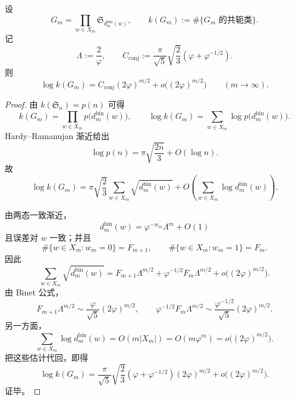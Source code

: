 \begin{theorem}[规范群共轭类数的显式主项]\label{thm:conclusion-binfold-gauge-conjugacy-midscale-asymptotic}
设
\[
G_m=\prod_{w\in X_m}\mathfrak S_{d_m^{\mathrm{bin}}(w)},
\qquad
k(G_m):=\#\{\text{\(G_m\) 的共轭类}\}.
\]
记
\[
\Lambda:=\frac{2}{\varphi},
\qquad
C_{\mathrm{conj}}
:=
\frac{\pi}{\sqrt5}\sqrt{\frac23}\left(\varphi+\varphi^{-1/2}\right).
\]
则
\[
\log k(G_m)
=
C_{\mathrm{conj}}(2\varphi)^{m/2}
+o\!\bigl((2\varphi)^{m/2}\bigr)
\qquad(m\to\infty).
\]
\end{theorem}
\begin{proof}
由 \(k(\mathfrak S_n)=p(n)\) 可得
\[
k(G_m)=\prod_{w\in X_m}p\!\bigl(d_m^{\mathrm{bin}}(w)\bigr),
\qquad
\log k(G_m)=\sum_{w\in X_m}\log p\!\bigl(d_m^{\mathrm{bin}}(w)\bigr).
\]
Hardy--Ramanujan 渐近给出
\[
\log p(n)=\pi\sqrt{\frac{2n}{3}}+O(\log n).
\]
故
\[
\log k(G_m)
=
\pi\sqrt{\frac23}\sum_{w\in X_m}\sqrt{d_m^{\mathrm{bin}}(w)}
+O\!\left(\sum_{w\in X_m}\log d_m^{\mathrm{bin}}(w)\right).
\]

由两态一致渐近，
\[
d_m^{\mathrm{bin}}(w)=\varphi^{-w_m}\Lambda^m+O(1)
\]
且误差对 \(w\) 一致；并且
\[
\#\{w\in X_m:w_m=0\}=F_{m+1},
\qquad
\#\{w\in X_m:w_m=1\}=F_m.
\]
因此
\[
\sum_{w\in X_m}\sqrt{d_m^{\mathrm{bin}}(w)}
=
F_{m+1}\Lambda^{m/2}
+\varphi^{-1/2}F_m\Lambda^{m/2}
+o\!\bigl((2\varphi)^{m/2}\bigr).
\]
由 Binet 公式，
\[
F_{m+1}\Lambda^{m/2}\sim \frac{\varphi}{\sqrt5}(2\varphi)^{m/2},
\qquad
\varphi^{-1/2}F_m\Lambda^{m/2}\sim \frac{\varphi^{-1/2}}{\sqrt5}(2\varphi)^{m/2}.
\]
另一方面，
\[
\sum_{w\in X_m}\log d_m^{\mathrm{bin}}(w)=O(m|X_m|)=O(m\varphi^m)=o\!\bigl((2\varphi)^{m/2}\bigr).
\]
把这些估计代回，即得
\[
\log k(G_m)
=
\frac{\pi}{\sqrt5}\sqrt{\frac23}\left(\varphi+\varphi^{-1/2}\right)(2\varphi)^{m/2}
+o\!\bigl((2\varphi)^{m/2}\bigr).
\]
证毕。
\end{proof}

